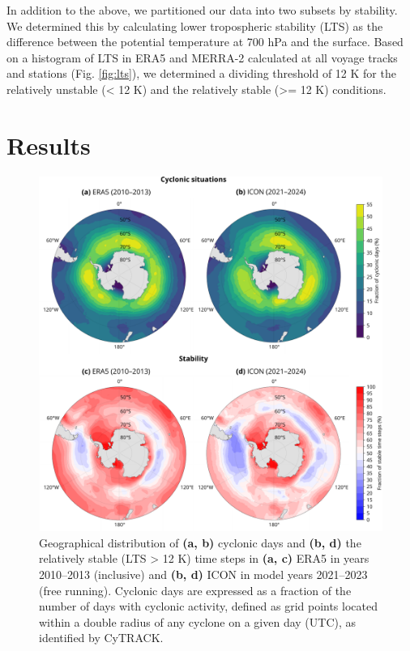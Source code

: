 \documentclass[12pt,a4paper]{article}
\begin{document}
In addition to the above, we partitioned our data into two subsets by
stability. We determined this by calculating lower tropospheric stability (LTS)
as the difference between the potential temperature at 700 hPa and the surface.
Based on a histogram of LTS in ERA5 and MERRA-2 calculated at all voyage tracks
and stations (Fig.  \ref{fig:lts}), we determined a dividing threshold of 12 K
for the relatively unstable (< 12 K) and the relatively stable (>= 12 K)
conditions.

\section{Results}
\label{sec:results}

\begin{figure}[p!]
\centering
\includegraphics[width=\textwidth]{img/cyc_stab_dist.pdf}
\caption{
Geographical distribution of \textbf{(a, b)} cyclonic days and \textbf{(b, d)}
the relatively stable (LTS > 12 K) time steps in \textbf{(a, c)} ERA5 in years
2010--2013 (inclusive) and \textbf{(b, d)} ICON in model years 2021--2023 (free
running). Cyclonic days are expressed as a fraction of the number of days with
cyclonic activity, defined as grid points located within a double radius of any
cyclone on a given day (UTC), as identified by CyTRACK.
}
\label{fig:cyclone-stability}
\end{figure}
\end{document}
